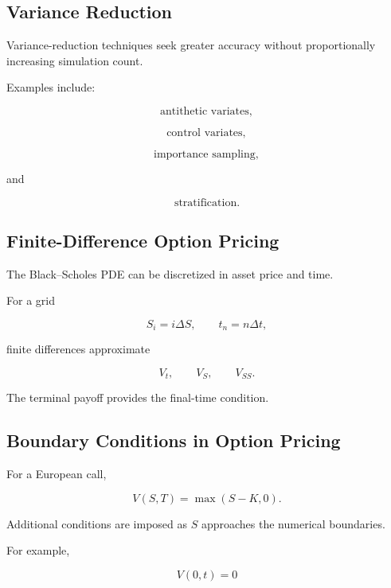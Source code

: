\subsection{Variance Reduction}
\label{subsec:finance-variance-reduction}

Variance-reduction techniques seek greater accuracy without proportionally
increasing simulation count.

Examples include:

\[
\boxed{
\text{antithetic variates},
}
\]

\[
\boxed{
\text{control variates},
}
\]

\[
\boxed{
\text{importance sampling},
}
\]

and

\[
\boxed{
\text{stratification}.
}
\]

\subsection{Finite-Difference Option Pricing}
\label{subsec:finite-difference-option-pricing}

The Black--Scholes PDE can be discretized in asset price and time.

For a grid

\[
S_i=i\Delta S,
\qquad
t_n=n\Delta t,
\]

finite differences approximate

\[
V_t,
\qquad
V_S,
\qquad
V_{SS}.
\]

The terminal payoff provides the final-time condition.

\subsection{Boundary Conditions in Option Pricing}
\label{subsec:option-pricing-boundary-conditions}

For a European call,

\[
\boxed{
V(S,T)
=
\max(S-K,0).
}
\]

Additional conditions are imposed as \(S\) approaches the numerical
boundaries.

For example,

\[
\boxed{
V(0,t)=0
}
\]

